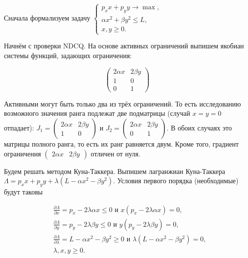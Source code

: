 \begin{solution}
Сначала формализуем задачу $\left\{\begin{array}{c} {p_{x} x+p_{y} y\to \max ,} \\ {\alpha x^{2} +\beta y^{2} \le L,} \\ {x,y\ge 0.} \end{array}\right. $

Начнём с проверки NDCQ. На основе активных ограничений выпишем якобиан системы функций, задающих ограничения:

\[
\begin{pmatrix}
2\alpha x & 2\beta y \\
1 & 0 \\
0 & 1 
\end{pmatrix}
\]

Активными могут быть только два из трёх ограничений. То есть исследованию возможного значения ранга подлежат две подматрицы (случай $x=y=0$ отпадает): 
$J_1=\begin{pmatrix}
2\alpha x & 2\beta y \\
1 & 0 
\end{pmatrix}$ и $J_2=\begin{pmatrix}
2\alpha x & 2\beta y \\
0 & 1
\end{pmatrix}$. 
В обоих случаях это матрицы полного ранга, то есть их ранг равняется двум. Кроме того, градиент ограничения $\begin{pmatrix}
2\alpha x & 2\beta y 
\end{pmatrix}$ отличен от нуля.

Будем решать методом Куна-Таккера. Выпишем лагранжиан Куна-Таккера $\Lambda =p_{x} x+p_{y} y+\lambda (L-\alpha x^{2} -\beta y^{2} )$. Условия первого порядка (необходимые) будут таковы

\begin{align}
\label{GrindEQ__1_} & \frac{\partial \Lambda }{\partial x} =p_{x} -2\lambda \alpha x\le 0 \text{ и } x(p_{x} -2\lambda \alpha x)=0, \\
\label{GrindEQ__2_}  & \frac{\partial \Lambda }{\partial y} =p_{y} -2\lambda \beta y\le 0 \text{ и } y(p_{y} -2\lambda \beta y)=0, \\
\label{GrindEQ__3_}  & \frac{\partial \Lambda }{\partial \lambda } =L-\alpha x^{2} -\beta y^{2} \ge 0 \text{ и } \lambda (L-\alpha x^{2} -\beta y^{2} )=0, \\
\label{GrindEQ__4_}  & \lambda ,x,y\ge 0. 
\end{align}



\end{solution}
